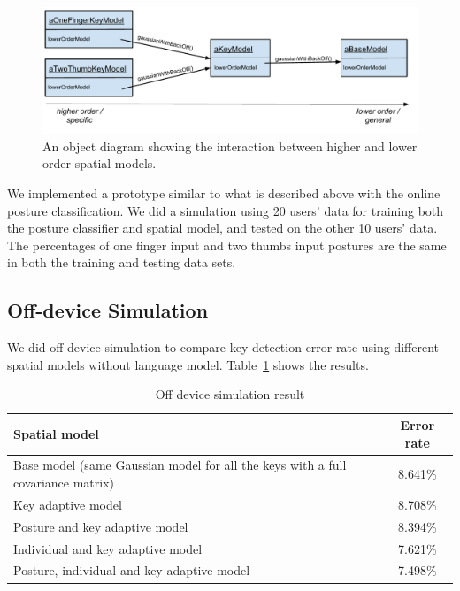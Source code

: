 \documentclass{sigchi}
\newcommand\tabhead[1]{\small\textbf{#1}}
\begin{document}
\begin{figure}[tb]
  \centering
  \includegraphics[width=1\columnwidth]{figures/chain-of-responsibility.pdf}
  \caption{An object diagram showing the interaction between higher and lower
  order spatial models.}
  \label{fig:chain-of-responsibility}
\end{figure}

We implemented a prototype similar to what is described above with the 
online posture classification. We did a simulation using 20 users' data for training
both the posture classifier and spatial model, and tested on the other 10 users' 
data. The percentages of one finger input and two thumbs input postures are the same in both the training and testing data sets.

\subsection{Off-device Simulation}
We did off-device simulation to compare
key detection error rate using different spatial models without language model.
Table~\ref{tab:off-device} shows the results.

\begin{table}[tb]
  \centering
  \begin{tabularx}{\columnwidth}{|X|c|}
  \hline
  \tabhead{Spatial model} & \tabhead{Error rate} \\
  \hline
  \multicolumn{1}{|p{0.7\columnwidth}|}{Base model (same Gaussian model for
    all the keys with a full covariance matrix)} & 8.641\% \\
  \hline
  Key adaptive model & 8.708\% \\
  \hline
  Posture and key adaptive model & 8.394\% \\
  \hline
  Individual and key adaptive model  & 7.621\%
  \\
  \hline
  Posture, individual and key adaptive model &  7.498\%
  \\
  \hline
  \end{tabularx}
  \caption{Off device simulation result}
  \label{tab:off-device}
\end{table}
\end{document}
